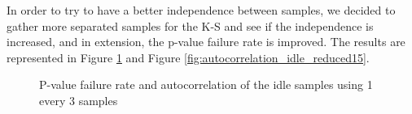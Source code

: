In order to try to have a better independence between samples, we decided to gather more separated samples for the \acs{K-S} and see if the independence is increased, and in extension, the p-value failure rate is improved. The results are represented in Figure \ref{fig:autocorrelation_idle_reduced13} and Figure \ref{fig:autocorrelation_idle_reduced15}.

\begin{figure}[h!]
	\centering
	\caption{P-value failure rate and autocorrelation of the idle samples using 1 every 3 samples}
	\label{fig:autocorrelation_idle_reduced13}
\end{figure}

